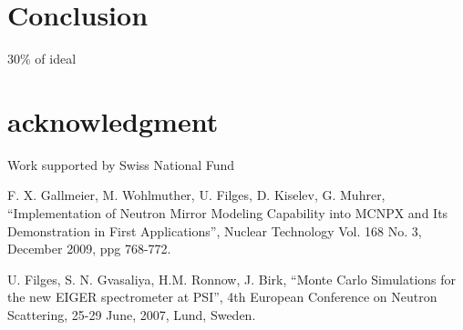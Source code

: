 \documentclass[a4paper,
              ]{jacow}
\begin{document}
\section{Conclusion}

30\% of ideal


\section{acknowledgment}

Work supported by Swiss National Fund



\begin{thebibliography}{99} %

	F. X. Gallmeier, M. Wohlmuther, U. Filges, D. Kiselev, G. Muhrer,
	``Implementation of Neutron Mirror Modeling Capability into MCNPX and Its Demonstration in First Applications'',
  Nuclear Technology Vol. 168 No. 3, December 2009, ppg 768-772.

  U. Filges, S. N. Gvasaliya, H.M. Ronnow, J. Birk,
  ``Monte Carlo Simulations for the new EIGER spectrometer at PSI'',
  4th European Conference on Neutron Scattering, 25-29 June, 2007, Lund, Sweden.

\end{thebibliography}
\end{document}
